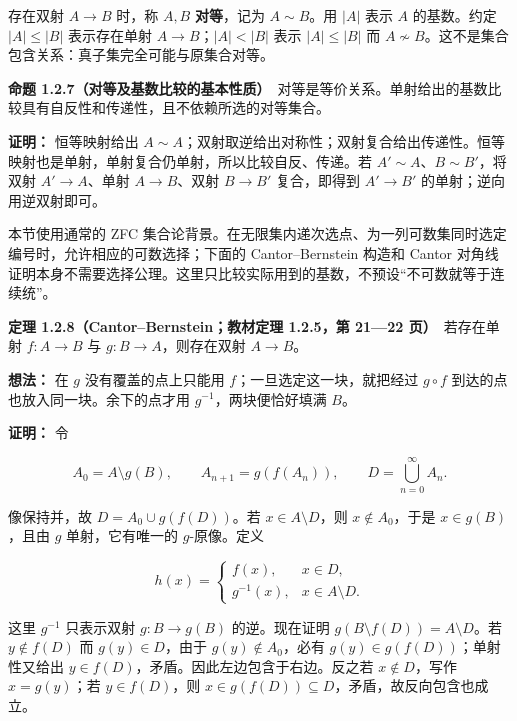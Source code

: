 \documentclass[11pt,a4paper]{article}
\begin{document}
存在双射 \(A\to B\) 时，称 \(A,B\) \textbf{对等}，记为 \(A\sim B\)。用
\(|A|\) 表示 \(A\) 的基数。约定 \(|A|\le|B|\) 表示存在单射
\(A\to B\)；\(|A|<|B|\) 表示 \(|A|\le|B|\) 而
\(A\not\sim B\)。这不是集合包含关系：真子集完全可能与原集合对等。

\textbf{命题
1.2.7（对等及基数比较的基本性质）}　对等是等价关系。单射给出的基数比较具有自反性和传递性，且不依赖所选的对等集合。

\textbf{证明：} 恒等映射给出
\(A\sim A\)；双射取逆给出对称性；双射复合给出传递性。恒等映射也是单射，单射复合仍单射，所以比较自反、传递。若
\(A'\sim A\)、\(B\sim B'\)，将双射 \(A'\to A\)、单射 \(A\to B\)、双射
\(B\to B'\) 复合，即得到 \(A'\to B'\) 的单射；逆向用逆双射即可。

本节使用通常的 ZFC
集合论背景。在无限集内递次选点、为一列可数集同时选定编号时，允许相应的可数选择；下面的
Cantor--Bernstein 构造和 Cantor
对角线证明本身不需要选择公理。这里只比较实际用到的基数，不预设``不可数就等于连续统''。

\textbf{定理 1.2.8（Cantor--Bernstein；教材定理 1.2.5，第 21---22
页）}　若存在单射 \(f:A\to B\) 与 \(g:B\to A\)，则存在双射 \(A\to B\)。

\textbf{想法：} 在 \(g\) 没有覆盖的点上只能用
\(f\)；一旦选定这一块，就把经过 \(g\circ f\)
到达的点也放入同一块。余下的点才用 \(g^{-1}\)，两块便恰好填满 \(B\)。

\textbf{证明：} 令

\begin{equation*}
A_0=A\setminus g(B),\qquad A_{n+1}=g(f(A_n)),\qquad
D=\bigcup_{n=0}^{\infty}A_n.
\tag{1.2.10}
\end{equation*}

像保持并，故 \(D=A_0\cup g(f(D))\)。若 \(x\in A\setminus D\)，则
\(x\notin A_0\)，于是 \(x\in g(B)\)，且由 \(g\) 单射，它有唯一的
\(g\)-原像。定义

\begin{equation*}
h(x)=\begin{cases}
f(x),&x\in D,\\
g^{-1}(x),&x\in A\setminus D.
\end{cases}\tag{1.2.11}
\end{equation*}

这里 \(g^{-1}\) 只表示双射 \(g:B\to g(B)\) 的逆。现在证明
\(g(B\setminus f(D))=A\setminus D\)。若 \(y\notin f(D)\) 而
\(g(y)\in D\)，由于 \(g(y)\notin A_0\)，必有
\(g(y)\in g(f(D))\)；单射性又给出
\(y\in f(D)\)，矛盾。因此左边包含于右边。反之若 \(x\notin D\)，写作
\(x=g(y)\)；若 \(y\in f(D)\)，则
\(x\in g(f(D))\subseteq D\)，矛盾，故反向包含也成立。
\end{document}
